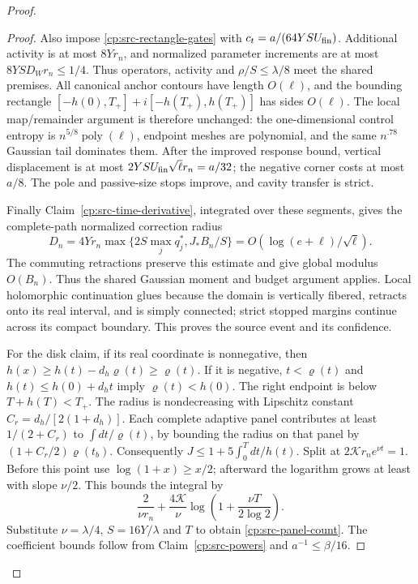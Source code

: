 \begin{proof}
\begin{proof}
Also impose \eqref{cp:src-rectangle-gates} with
\(c_t=a/(64YSU_{\rm fin})\).  Additional activity is at most
\(8Yr_n\), and normalized parameter increments are at most
\(8YSD_Wr_n\le1/4\).  Thus operators, activity and
\(\rho/S\le\lambda/8\) meet the shared premises.
All canonical anchor contours have length \(O(\ell)\), and the
bounding rectangle
\([-h(0),T_+]+i[-h(T_+),h(T_+)]\) has sides \(O(\ell)\).
The local map/remainder argument is therefore unchanged: the
one-dimensional control entropy is
\(n^{5/8}\operatorname{poly}(\ell)\), endpoint meshes are
polynomial, and the same \(n^{.78}\) Gaussian tail dominates them.
After the improved response bound, vertical displacement is at most
\(2YSU_{\rm fin}\sqrt\ell r_n=a/32\); the negative corner costs
at most \(a/8\).  The pole and passive-size stops improve, and
cavity transfer is strict.

Finally Claim~\ref{cp:src-time-derivative}, integrated over these
segments, gives the complete-path normalized correction radius
\[
 D_n=4Yr_n\max\{2S\max_jq_j^*,J_*B_n/S\}
                 =O(\log(e+\ell)/\sqrt\ell).
\]
The commuting retractions preserve this estimate and give global
modulus \(O(B_n)\).  Thus the shared Gaussian moment and budget
argument applies.  Local holomorphic continuation glues because the
domain is vertically fibered, retracts onto its real interval, and
is simply connected; strict stopped margins continue across its
compact boundary.  This proves the source event and its confidence.

For the disk claim, if its real coordinate is nonnegative, then
\(h(x)\ge h(t)-d_h\varrho(t)\ge\varrho(t)\).
If it is negative, \(t<\varrho(t)\) and
\(h(t)\le h(0)+d_ht\) imply \(\varrho(t)<h(0)\).
The right endpoint is below \(T+h(T)<T_+\).
The radius is nondecreasing with Lipschitz constant
\(C_r=d_h/[2(1+d_h)]\).  Each complete adaptive panel contributes
at least \(1/(2+C_r)\) to \(\int dt/\varrho(t)\), by bounding
the radius on that panel by \((1+C_r/2)\varrho(t_b)\).
Consequently \(J\le1+5\int_0^Tdt/h(t)\).
Split at \(2\mathcal Kr_ne^{\nu t}=1\).  Before this point use
\(\log(1+x)\ge x/2\); afterward the logarithm grows at least
with slope \(\nu/2\).  This bounds the integral by
\[
 \frac2{\nu r_n}+\frac{4\mathcal K}{\nu}
             \log\left(1+\frac{\nu T}{2\log2}\right).
\]
Substitute \(\nu=\lambda/4\), \(S=16Y/\lambda\) and \(T\)
to obtain \eqref{cp:src-panel-count}.  The coefficient bounds follow
from Claim~\ref{cp:src-powers} and \(a^{-1}\le\beta/16\).
\end{proof}


\end{proof}
